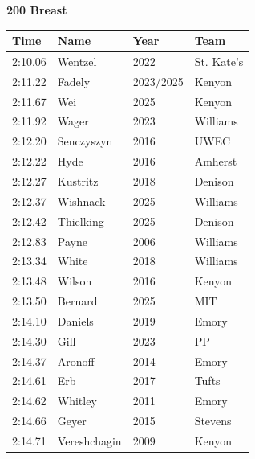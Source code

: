 \noindent\begin{minipage}[t]{0.98\textwidth}
\centering
\textbf{\textcolor{teamprimary}{200 Breast}}\par
\vspace{0.5em}
\centering
\small
\renewcommand{\arraystretch}{1.0}
\setlength{\tabcolsep}{4pt}
\begin{tabular}{@{}p{2.5cm}p{4.5cm}p{1.5cm}p{2.5cm}@{}}
\toprule
\textbf{Time} & \textbf{Name} & \textbf{Year} & \textbf{Team} \\
\midrule
2:10.06 & Wentzel & 2022 & St. Kate's \\
2:11.22 & Fadely & 2023/2025 & Kenyon \\
2:11.67 & Wei & 2025 & Kenyon \\
2:11.92 & Wager & 2023 & Williams \\
2:12.20 & Senczyszyn & 2016 & UWEC \\
2:12.22 & Hyde & 2016 & Amherst \\
2:12.27 & Kustritz & 2018 & Denison \\
2:12.37 & Wishnack & 2025 & Williams \\
2:12.42 & Thielking & 2025 & Denison \\
2:12.83 & Payne & 2006 & Williams \\
2:13.34 & White & 2018 & Williams \\
2:13.48 & Wilson & 2016 & Kenyon \\
2:13.50 & Bernard & 2025 & MIT \\
2:14.10 & Daniels & 2019 & Emory \\
2:14.30 & Gill & 2023 & PP \\
2:14.37 & Aronoff & 2014 & Emory \\
2:14.61 & Erb & 2017 & Tufts \\
2:14.62 & Whitley & 2011 & Emory \\
2:14.66 & Geyer & 2015 & Stevens \\
2:14.71 & Vereshchagin & 2009 & Kenyon \\
\bottomrule
\end{tabular}
\end{minipage}
\vspace{1.2em}
